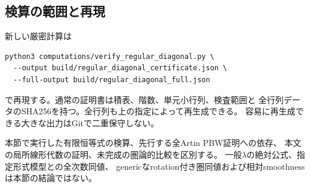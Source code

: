 \subsection{検算の範囲と再現}
新しい厳密計算は
\begin{verbatim}
python3 computations/verify_regular_diagonal.py \
  --output build/regular_diagonal_certificate.json \
  --full-output build/regular_diagonal_full.json
\end{verbatim}
で再現する。通常の証明書は積表、階数、単元小行列、検査範囲と
全行列データのSHA256を持つ。全行列も上の指定によって再生成できる。
容易に再生成できる大きな出力はGitで二重保守しない。

本節で実行した有限恒等式の検算、先行する全Artin PBW証明への依存、
本文の局所線形代数の証明、未完成の圏論的比較を区別する。
一般$\lambda$の絶対公式、指定形式模型との全次数同値、
genericなrotation付き圏同値および相対smoothnessは本節の結論ではない。

